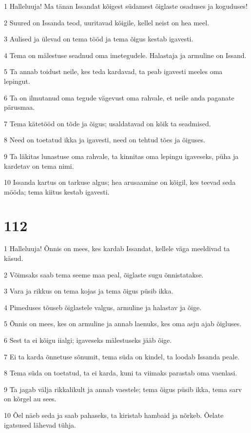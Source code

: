 \par 1 Halleluuja! Ma tänan Issandat kõigest südamest õiglaste osaduses ja koguduses!
\par 2 Suured on Issanda teod, uuritavad kõigile, kellel neist on hea meel.
\par 3 Aulised ja ülevad on tema tööd ja tema õigus kestab igavesti.
\par 4 Tema on mälestuse seadnud oma imetegudele. Halastaja ja armuline on Issand.
\par 5 Ta annab toidust neile, kes teda kardavad, ta peab igavesti meeles oma lepingut.
\par 6 Ta on ilmutanud oma tegude vägevust oma rahvale, et neile anda paganate pärusmaa.
\par 7 Tema kätetööd on tõde ja õigus; usaldatavad on kõik ta seadmised.
\par 8 Need on toetatud ikka ja igavesti, need on tehtud tões ja õiguses.
\par 9 Ta läkitas lunastuse oma rahvale, ta kinnitas oma lepingu igaveseks, püha ja kardetav on tema nimi.
\par 10 Issanda kartus on tarkuse algus; hea arusaamine on kõigil, kes teevad seda mööda; tema kiitus kestab igavesti.

\chapter{112}

\par 1 Halleluuja! Õnnis on mees, kes kardab Issandat, kellele väga meeldivad ta käsud.
\par 2 Võimsaks saab tema seeme maa peal, õiglaste sugu õnnistatakse.
\par 3 Vara ja rikkus on tema kojas ja tema õigus püsib ikka.
\par 4 Pimeduses tõuseb õiglastele valgus, armuline ja halastav ja õige.
\par 5 Õnnis on mees, kes on armuline ja annab laenuks, kes oma asju ajab õigluses.
\par 6 Sest ta ei kõigu iialgi; igaveseks mälestuseks jääb õige.
\par 7 Ei ta karda õnnetuse sõnumit, tema süda on kindel, ta loodab Issanda peale.
\par 8 Tema süda on toetatud, ta ei karda, kuni ta viimaks parastab oma vaenlasi.
\par 9 Ta jagab välja rikkalikult ja annab vaestele; tema õigus püsib ikka, tema sarv on kõrgel au sees.
\par 10 Õel näeb seda ja saab pahaseks, ta kiristab hambaid ja nõrkeb. Õelate igatsused lähevad tühja.

